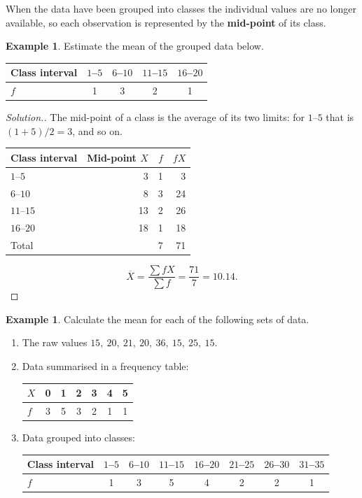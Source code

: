 \documentclass[11pt,a4paper]{article}
\theoremstyle{definition}
\newtheorem{example}[thm]{Example}
\newenvironment{solution}
  {\renewcommand{\qedsymbol}{}\begin{proof}[\textit{Solution}.]}
  {\end{proof}}
\begin{document}
When the data have been grouped into classes the individual values are no longer available,
so each observation is represented by the \textbf{mid-point} of its class.

\begin{example}
Estimate the mean of the grouped data below.
\begin{table}[H]
\centering
\begin{tabular}{lcccc}
Class interval & $1$--$5$ & $6$--$10$ & $11$--$15$ & $16$--$20$\\
\hline
$f$ & 1 & 3 & 2 & 1\\
\end{tabular}
\end{table}
\end{example}

\begin{solution}
The mid-point of a class is the average of its two limits: for $1$--$5$ that is
$(1+5)/2=3$, and so on.
\begin{table}[H]
\centering
\begin{tabular}{lrrr}
Class interval & Mid-point $X$ & $f$ & $fX$\\
\hline
$1$--$5$   & 3  & 1 & 3\\
$6$--$10$  & 8  & 3 & 24\\
$11$--$15$ & 13 & 2 & 26\\
$16$--$20$ & 18 & 1 & 18\\
\hline
Total      &    & 7 & 71\\
\end{tabular}
\end{table}
\[\overline{X}=\frac{\sum fX}{\sum f}=\frac{71}{7}=10.14.\]
\end{solution}

\begin{example}
Calculate the mean for each of the following sets of data.
\begin{enumerate}
\item[(a).] The raw values $15,\ 20,\ 21,\ 20,\ 36,\ 15,\ 25,\ 15$.
\item[(b).] Data summarised in a frequency table:
\begin{table}[H]
\centering
\begin{tabular}{lcccccc}
$X$ & 0 & 1 & 2 & 3 & 4 & 5\\
\hline
$f$ & 3 & 5 & 3 & 2 & 1 & 1\\
\end{tabular}
\end{table}
\item[(c).] Data grouped into classes:
\begin{table}[H]
\centering
\begin{tabular}{lccccccc}
Class interval & $1$--$5$ & $6$--$10$ & $11$--$15$ & $16$--$20$ & $21$--$25$ & $26$--$30$ & $31$--$35$\\
\hline
$f$ & 1 & 3 & 5 & 4 & 2 & 2 & 1\\
\end{tabular}
\end{table}
\end{enumerate}
\end{example}
\end{document}
